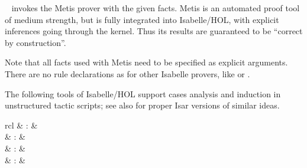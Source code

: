 \begin{isabellebody}
\begin{isamarkuptext}
\begin{description}
  \item \hyperlink{method.HOL.metis}{\mbox{}}~ invokes the Metis prover
  with the given facts.  Metis is an automated proof tool of medium
  strength, but is fully integrated into Isabelle/HOL, with explicit
  inferences going through the kernel.  Thus its results are
  guaranteed to be ``correct by construction''.

  Note that all facts used with Metis need to be specified as explicit
  arguments.  There are no rule declarations as for other Isabelle
  provers, like \hyperlink{method.blast}{\mbox{}} or \hyperlink{method.fast}{\mbox{}}.

  \end{description}%
\end{isamarkuptext}%
\isamarkuptrue%
%
\isamarkuptrue%
%
\begin{isamarkuptext}%
The following tools of Isabelle/HOL support cases analysis and
  induction in unstructured tactic scripts; see also
   for proper Isar versions of similar ideas.

  \begin{matharray}{rcl}
    \hypertarget{method.HOL.case-tac}{\hyperlink{method.HOL.case-tac}{\mbox{}}}\isa{{\isachardoublequote}\isactrlsup {\isacharasterisk}{\isachardoublequote}} & : &  \\
    \hypertarget{method.HOL.induct-tac}{\hyperlink{method.HOL.induct-tac}{\mbox{}}}\isa{{\isachardoublequote}\isactrlsup {\isacharasterisk}{\isachardoublequote}} & : &  \\
    \hypertarget{method.HOL.ind-cases}{\hyperlink{method.HOL.ind-cases}{\mbox{}}}\isa{{\isachardoublequote}\isactrlsup {\isacharasterisk}{\isachardoublequote}} & : &  \\
    \hypertarget{command.HOL.inductive-cases}{\hyperlink{command.HOL.inductive-cases}{\mbox{}}}\isa{{\isachardoublequote}\isactrlsup {\isacharasterisk}{\isachardoublequote}} & : &  \\
  \end{matharray}


\end{isamarkuptext}
\end{isabellebody}
